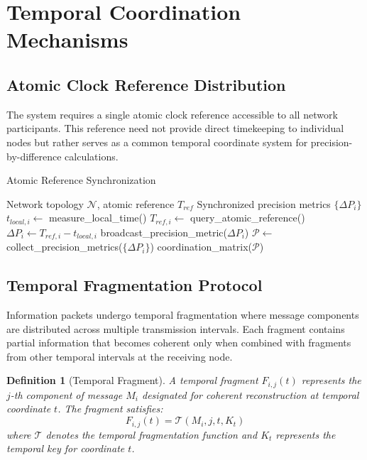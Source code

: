 \documentclass[12pt,a4paper]{article}
\newtheorem{definition}{Definition}
\begin{document}
\section{Temporal Coordination Mechanisms}

\subsection{Atomic Clock Reference Distribution}

The system requires a single atomic clock reference accessible to all network participants. This reference need not provide direct timekeeping to individual nodes but rather serves as a common temporal coordinate system for precision-by-difference calculations.

\begin{algorithm}
\caption{Atomic Reference Synchronization}
\begin{algorithmic}[1]
\Require Network topology $\mathcal{N}$, atomic reference $T_{ref}$
\Ensure Synchronized precision metrics $\{\Delta P_i\}$
    \State $t_{local,i} \leftarrow$ measure\_local\_time()
    \State $T_{ref,i} \leftarrow$ query\_atomic\_reference()
    \State $\Delta P_i \leftarrow T_{ref,i} - t_{local,i}$
    \State broadcast\_precision\_metric($\Delta P_i$)
\EndFor
\State $\mathcal{P} \leftarrow$ collect\_precision\_metrics($\{\Delta P_i\}$)
\State \Return coordination\_matrix($\mathcal{P}$)
\end{algorithmic}
\end{algorithm}

\subsection{Temporal Fragmentation Protocol}

Information packets undergo temporal fragmentation where message components are distributed across multiple transmission intervals. Each fragment contains partial information that becomes coherent only when combined with fragments from other temporal intervals at the receiving node.

\begin{definition}[Temporal Fragment]
A temporal fragment $F_{i,j}(t)$ represents the $j$-th component of message $M_i$ designated for coherent reconstruction at temporal coordinate $t$. The fragment satisfies:
\begin{equation}
F_{i,j}(t) = \mathcal{T}(M_i, j, t, K_t)
\end{equation}
where $\mathcal{T}$ denotes the temporal fragmentation function and $K_t$ represents the temporal key for coordinate $t$.
\end{definition}
\end{document}
